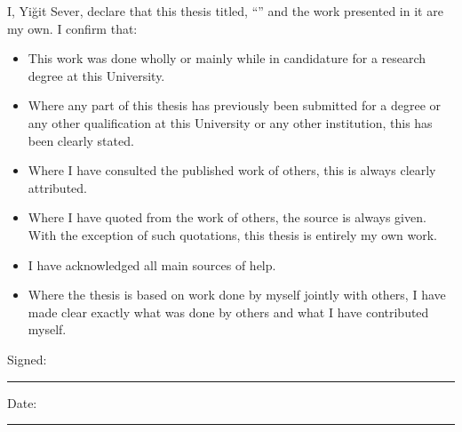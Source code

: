 \documentclass[
12pt, %
english, %
onehalfspacing, %
nolistspacing, %
parskip, %
headsepline, %
consistentlayout, %
]{MastersDoctoralThesis} %
\begin{document}
\begin{declaration}
\addchaptertocentry{\authorshipname} %
\noindent I, Yiğit Sever, declare that this thesis titled, \enquote{\ttitle} and the work presented in it are my own. I confirm that:

\begin{itemize}
\item This work was done wholly or mainly while in candidature for a research degree at this University.
\item Where any part of this thesis has previously been submitted for a degree or any other qualification at this University or any other institution, this has been clearly stated.
\item Where I have consulted the published work of others, this is always clearly attributed.
\item Where I have quoted from the work of others, the source is always given. With the exception of such quotations, this thesis is entirely my own work.
\item I have acknowledged all main sources of help.
\item Where the thesis is based on work done by myself jointly with others, I have made clear exactly what was done by others and what I have contributed myself.
\end{itemize}

\noindent Signed:\\
\rule[0.5em]{25em}{0.5pt} %

\noindent Date:\\
\rule[0.5em]{25em}{0.5pt} %
\end{declaration}





\end{document}

